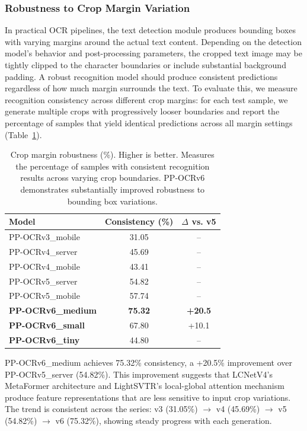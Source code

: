 \documentclass[11pt, a4paper,logo,  copyright, nonumbering]{paddleocr}
\begin{document}
\subsubsection{Robustness to Crop Margin Variation}

In practical OCR pipelines, the text detection module produces bounding boxes with varying margins around the actual text content. Depending on the detection model's behavior and post-processing parameters, the cropped text image may be tightly clipped to the character boundaries or include substantial background padding. A robust recognition model should produce consistent predictions regardless of how much margin surrounds the text. To evaluate this, we measure recognition consistency across different crop margins: for each test sample, we generate multiple crops with progressively looser boundaries and report the percentage of samples that yield identical predictions across all margin settings (Table~\ref{tab:crop_robust}).

\begin{table}[!htbp]
\centering
\small
\begin{tabular}{lcc}
\toprule
\textbf{Model} & \textbf{Consistency (\%)} & \textbf{$\Delta$ vs. v5} \\
\midrule
PP-OCRv3\_mobile & 31.05 & -- \\
PP-OCRv4\_server & 45.69 & -- \\
PP-OCRv4\_mobile & 43.41 & -- \\
PP-OCRv5\_server & 54.82 & -- \\
PP-OCRv5\_mobile & 57.74 & -- \\
\midrule
\textbf{PP-OCRv6\_medium} & \textbf{75.32} & \textbf{+20.5} \\
\textbf{PP-OCRv6\_small} & 67.80 & +10.1 \\
\textbf{PP-OCRv6\_tiny} & 44.80 & -- \\
\bottomrule
\end{tabular}
\caption{Crop margin robustness (\%). Higher is better. Measures the percentage of samples with consistent recognition results across varying crop boundaries. PP-OCRv6 demonstrates substantially improved robustness to bounding box variations.}
\label{tab:crop_robust}
\end{table}

PP-OCRv6\_medium achieves 75.32\% consistency, a +20.5\% improvement over PP-OCRv5\_server (54.82\%). This improvement suggests that LCNetV4's MetaFormer architecture and LightSVTR's local-global attention mechanism produce feature representations that are less sensitive to input crop variations. The trend is consistent across the series: v3 (31.05\%) $\to$ v4 (45.69\%) $\to$ v5 (54.82\%) $\to$ v6 (75.32\%), showing steady progress with each generation.
\end{document}

